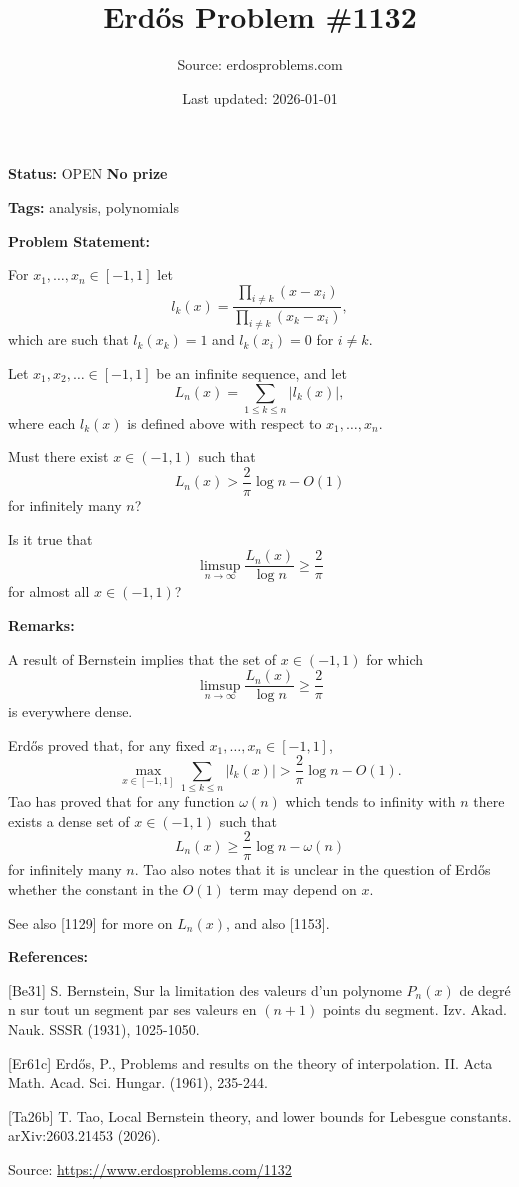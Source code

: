 \documentclass{article}
\title{Erd\H{o}s Problem \#1132}
\date{Last updated: 2026-01-01}
\author{Source: erdosproblems.com}
\begin{document}
\maketitle

\noindent\textbf{Status:} OPEN \quad \textbf{No prize}

\noindent\textbf{Tags:} analysis, polynomials

\medskip
\noindent\textbf{Problem Statement:}

For $x_1,\ldots,x_n\in [-1,1]$ let\[l_k(x)=\frac{\prod_{i\neq k}(x-x_i)}{\prod_{i\neq k}(x_k-x_i)},\]which are such that $l_k(x_k)=1$ and $l_k(x_i)=0$ for $i\neq k$.

Let $x_1,x_2,\ldots\in [-1,1]$ be an infinite sequence, and let\[L_n(x) = \sum_{1\leq k\leq n}\lvert l_k(x)\rvert,\]where each $l_k(x)$ is defined above with respect to $x_1,\ldots,x_n$.

Must there exist $x\in (-1,1)$ such that\[L_n(x) >\frac{2}{\pi}\log n-O(1)\]for infinitely many $n$?

Is it true that\[\limsup_{n\to \infty}\frac{L_n(x)}{\log n}\geq \frac{2}{\pi}\]for almost all $x\in (-1,1)$?

\bigskip
\noindent\textbf{Remarks:}

A result of Bernstein \cite{Be31} implies that the set of $x\in(-1,1)$ for which\[\limsup_{n\to \infty}\frac{L_n(x)}{\log n}\geq \frac{2}{\pi}\]is everywhere dense.

Erd\H{o}s \cite{Er61c} proved that, for any fixed $x_1,\ldots,x_n\in [-1,1]$,\[\max_{x\in [-1,1]}\sum_{1\leq k\leq n}\lvert l_k(x)\rvert>\frac{2}{\pi}\log n-O(1).\]Tao \cite{Ta26b} has proved that for any function $\omega(n)$ which tends to infinity with $n$ there exists a dense set of $x\in (-1,1)$ such that\[L_n(x)\geq \frac{2}{\pi}\log n-\omega(n)\]for infinitely many $n$. Tao also notes that it is unclear in the question of Erd\H{o}s whether the constant in the $O(1)$ term may depend on $x$.

See also [1129] for more on $L_n(x)$, and also [1153].

\bigskip
\noindent\textbf{References:}

[Be31] S. Bernstein, Sur la limitation des valeurs d'un polynome $P_n(x)$ de degr\'{e} n sur tout un segment par ses valeurs en $(n+1)$ points du segment. Izv. Akad. Nauk. SSSR (1931), 1025-1050.
 
 [Er61c] Erd\H{o}s, P., Problems and results on the theory of interpolation. II. Acta Math. Acad. Sci. Hungar. (1961), 235-244.
 
 [Ta26b] T. Tao, Local Bernstein theory, and lower bounds for Lebesgue constants. arXiv:2603.21453 (2026).

\bigskip
\noindent\small{Source: \url{https://www.erdosproblems.com/1132}}
\end{document}

